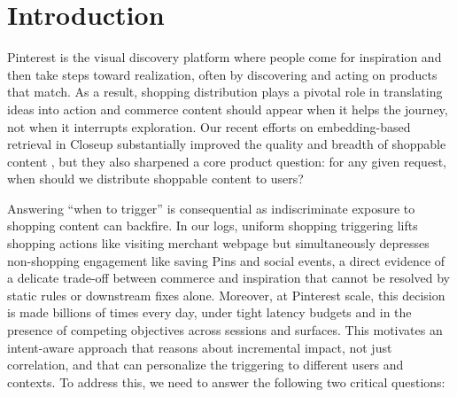 \documentclass[sigconf, authorversion]{acmart}
\begin{document}




\maketitle

\section{Introduction}
Pinterest is the visual discovery platform where people come for inspiration and then take steps toward realization, often by discovering and acting on products that match. As a result, shopping distribution plays a pivotal role in translating ideas into action and commerce content should appear when it helps the journey, not when it interrupts exploration. Our recent efforts on embedding-based retrieval in Closeup substantially improved the quality and breadth of shoppable content \cite{Hou2025Optimize}, but they also sharpened a core product question: for any given request, when should we distribute shoppable content to users?

Answering ``when to trigger'' is consequential as indiscriminate exposure to shopping content can backfire. In our logs, uniform shopping triggering lifts shopping actions like visiting merchant webpage but simultaneously depresses non-shopping engagement like saving Pins and social events, a direct evidence of a delicate trade-off between commerce and inspiration that cannot be resolved by static rules or downstream fixes alone. Moreover, at Pinterest scale, this decision is made billions of times every day, under tight latency budgets and in the presence of competing objectives across sessions and surfaces. This motivates an intent-aware approach that reasons about incremental impact, not just correlation, and that can personalize the triggering to different users and contexts. To address this, we need to answer the following two critical questions:
\end{document}
